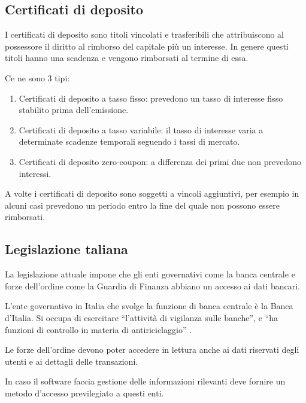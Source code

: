 \documentclass[10pt]{softeng} %
\begin{document}

\subsection{Certificati di deposito}

I certificati di deposito sono titoli vincolati e trasferibili che attribuiscono al possessore il diritto al rimborso del capitale più un interesse.
In genere questi titoli hanno una scadenza e vengono rimborsati al termine di essa.

Ce ne sono 3 tipi:
\begin{enumerate}
    \item Certificati di deposito a tasso fisso: prevedono un tasso di interesse fisso stabilito prima dell'emissione.
    \item Certificati di deposito a tasso variabile: il tasso di interesse varia a determinate scadenze temporali seguendo i tassi di mercato.
    \item Certificati di deposito zero-coupon: a differenza dei primi due non prevedono interessi.
\end{enumerate}

A volte i certificati di deposito sono soggetti a vincoli aggiuntivi, per esempio in alcuni casi prevedono un periodo entro la fine del quale non possono essere rimborsati.

\subsection{Legislazione taliana}

La legislazione attuale impone che gli enti governativi come la banca centrale e forze dell'ordine come la Guardia di Finanza abbiano un accesso ai dati bancari.

L'ente governativo in Italia che svolge la funzione di banca centrale \`e la Banca d'Italia.
Si occupa di esercitare ``l'attivit\`a di vigilanza sulle banche'', e ``ha funzioni di controllo in materia di antiriciclaggio'' \cite[Funzioni]{banca_italia}.

Le forze dell'ordine devono poter accedere in lettura anche ai dati riservati degli utenti e ai dettagli delle transazioni.

In caso il software faccia gestione delle informazioni rilevanti deve fornire un metodo d'accesso previlegiato a questi enti.
\end{document}
